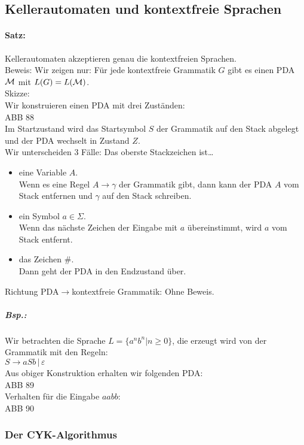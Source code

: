 \subsection{Kellerautomaten und kontextfreie Sprachen}
\paragraph{Satz:} Kellerautomaten akzeptieren genau die kontextfreien Sprachen.\\
Beweis: Wir zeigen nur: Für jede kontextfreie Grammatik $G$ gibt es einen PDA $\mathcal{M}$ mit $L(G)=L(\mathcal{M})$.\\
Skizze: \\
Wir konstruieren einen PDA mit drei Zuständen:\\
ABB 88\\
Im Startzustand wird das Startsymbol $S$ der Grammatik auf den Stack abgelegt und der PDA wechselt in Zustand $Z$.\\
Wir unterscheiden 3 Fälle: Das oberste Stackzeichen ist…
\begin{itemize}
\item eine Variable $A$.\\
Wenn es eine Regel $A\to \gamma$ der Grammatik gibt, dann kann der PDA $A$ vom Stack entfernen und $\gamma$ auf den Stack schreiben.
\item ein Symbol $a\in \Sigma$.\\
Wenn das nächste Zeichen der Eingabe mit $a$ übereinstimmt, wird $a$ vom Stack entfernt.
\item das Zeichen $\#$.\\
Dann geht der PDA in den Endzustand über.
\end{itemize}
Richtung PDA$\to$kontextfreie Grammatik: Ohne Beweis.
\subparagraph{Bsp.:} Wir betrachten die Sprache $L=\{a^nb^n|n\geq 0\}$, die erzeugt wird von der Grammatik mit den Regeln:\\
$S\to aSb \,|\, \varepsilon$\\
Aus obiger Konstruktion erhalten wir folgenden PDA:\\
ABB 89\\
Verhalten für die Eingabe $aabb$:\\
ABB 90

\subsubsection{Der CYK-Algorithmus}

